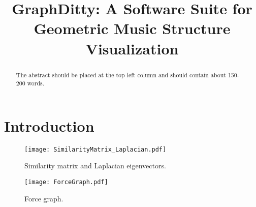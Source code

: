 \documentclass{article}
\title{GraphDitty: A Software Suite for Geometric Music Structure Visualization}
\begin{document}
%
\maketitle
%
\begin{abstract}
The abstract should be placed at the top left column and should contain about 150-200 words.
\end{abstract}
%
\section{Introduction}\label{sec:introduction}


\begin{figure}
 \texttt{[image: SimilarityMatrix\_Laplacian.pdf]}
 \caption{Similarity matrix and Laplacian eigenvectors.}
 \label{fig:example}
\end{figure}


\begin{figure}
 \texttt{[image: ForceGraph.pdf]}
 \caption{Force graph.}
 \label{fig:example}
\end{figure}


\end{document}
